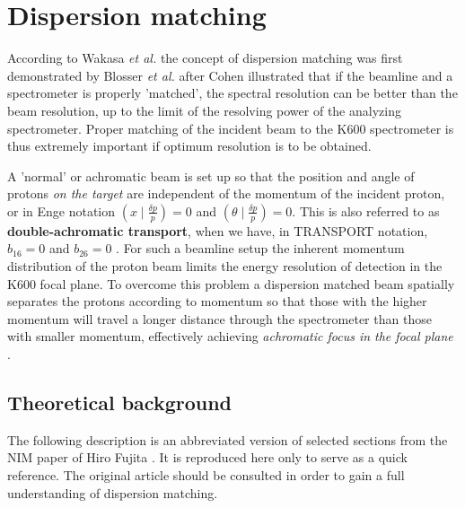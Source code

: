 \documentclass[11pt]{report}
\begin{document}
\clearpage

\chapter{Dispersion matching}\label{chap:Dispersion-Matching}


According to Wakasa {\it et al.} \cite{Wak02}
the concept of dispersion matching was first demonstrated by Blosser {\it et al.}
\cite{Blo71} after Cohen \cite{Coh59} illustrated that if the beamline and a spectrometer 
is properly 'matched', the spectral resolution can be better than 
the beam resolution, up to the limit of the resolving power of the analyzing 
spectrometer.
Proper matching of the incident beam to the K600 spectrometer is thus extremely
important if optimum resolution is to be obtained. 

A 'normal' or achromatic beam is set up so that the position and angle of protons {\it on the target} 
are independent of the momentum of the incident proton, 
or in Enge \cite{Eng81} notation $(x \mid \frac{\delta p}{p})=0$ and $(\theta \mid \frac{\delta p}{p})=0$. 
This is also referred to as {\bf double-achromatic transport}, when we have,
in TRANSPORT notation, $b_{16}=0$ and  $b_{26}=0$  \cite{Fuj02} %
\cite{Wak02}. %
For such a beamline setup the inherent momentum distribution of the proton beam limits the 
energy resolution of detection in the K600 focal plane.
%
To overcome this problem a dispersion matched beam spatially separates the protons according to momentum 
so that those with the higher momentum will travel a longer distance through the spectrometer than those 
with smaller momentum, effectively achieving 
{\it achromatic focus in the focal plane} \cite{Fuj00} \cite{Fuj02}.  %





\section{Theoretical background}

The following description is an abbreviated version of selected sections 
from the NIM paper of Hiro Fujita \cite{Fuj02}. It is reproduced here only to serve
as a quick reference. The original article should be consulted in order
to gain a full understanding of dispersion matching.
\end{document}
